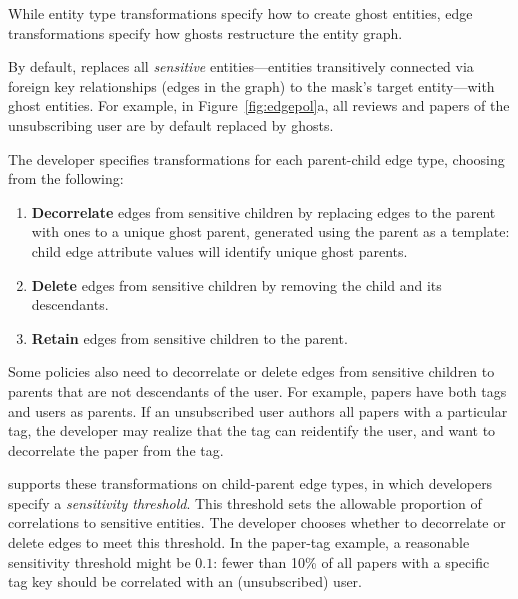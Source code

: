 While entity type transformations specify how to create ghost entities, edge transformations 
specify how ghosts restructure the entity graph.

By default, \sys replaces all \emph{sensitive} entities---entities transitively connected via foreign key
relationships (edges in the graph) to the mask's target entity---with ghost entities.
For example, in Figure~\ref{fig:edgepol}a, all reviews and papers of the unsubscribing user are by
default replaced by ghosts.


The developer specifies transformations for each parent-child edge type, choosing from the following:
\begin{enumerate}
    \item \textbf{Decorrelate} edges from sensitive children by replacing edges to the parent with
        ones to a unique ghost parent, generated using the parent as a template:
        child edge attribute values will identify unique ghost parents.
    \item \textbf{Delete} edges from sensitive children by removing the child and its descendants.
    \item \textbf{Retain} edges from sensitive children to the parent.
\end{enumerate}

Some policies also need to decorrelate or delete edges from sensitive children to parents that are
not descendants of the user. For example, papers have both tags and users as parents. If an
unsubscribed user authors all papers with a particular tag, the developer may realize that the tag
can reidentify the user, and want to decorrelate the paper from the tag.

\sys supports these transformations on child-parent edge types, in which developers specify  a
\emph{sensitivity threshold}. This threshold sets the allowable proportion of correlations to
sensitive entities. The developer chooses whether to decorrelate or delete edges to meet this
threshold. In the paper-tag example, a reasonable sensitivity threshold might be $0.1$: fewer than
10\% of all papers with a specific tag key should be correlated with an (unsubscribed) user.

